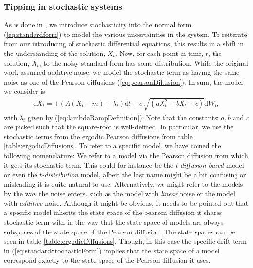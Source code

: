 \subsubsection{Tipping in stochastic systems}
As is done in \cite[equation (1)]{Ditlevsen2023}, we introduce stochasticity into the normal form (\ref{eq:standardform}) to model the various uncertainties in the system. To reiterate from our introducing of stochastic differential equations, this results in a shift in the understanding of the solution, $X_t$. Now, for each point in time, $t$, the solution, $X_t$, to the noisy standard form has some distribution. While the original work assumed additive noise; we model the stochastic term as having the same noise as one of the Pearson diffusions (\ref{eq:pearsonDiffusion}). In sum, the model we consider is
\begin{align}
    \mathrm{d}X_t = \pm\left(A\left(X_t - m\right) + \lambda_t\right)\mathrm{d}t + \sigma\sqrt{\left(aX_t^2 + bX_t + c\right)}\mathrm{d}W_t, \label{eq:standardStochasticForm}
\end{align}
with $\lambda_t$ given by (\ref{eq:lambdaRampDefinition}). Note that the constants: $a, b$ and $c$ are picked such that the square-root is well-defined. In particular, we use the stochastic terms from the ergodic Pearson diffusions from table \ref{table:ergodicDiffusions}. To refer to a specific model, we have coined the following nomenclature: We refer to a model via the Pearson diffusion from which it gets its stochastic term. This could for instance be the \textit{$t$-diffusion based} model or even the \textit{$t$-distribution} model, albeit the last name might be a bit confusing or misleading it is quite natural to use. Alternatively, we might refer to the models by the way the noise enters, such as the model with \textit{linear} noise or the model with \textit{additive} noise. Although it might be obvious, it needs to be pointed out that a specific model inherits the state space of the pearson diffusion it shares stochastic term with in the way that the state space of models are always subspaces of the state space of the Pearson diffusion. The state spaces can be seen in table \ref{table:ergodicDiffusions}. Though, in this case the specific drift term in (\ref{eq:standardStochasticForm}) implies that the state space of a model correspond exactly to the state space of the Pearson diffusion it uses.\\\\
